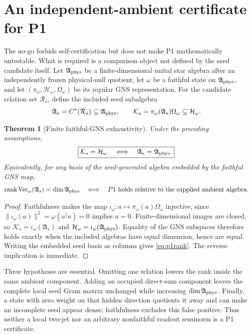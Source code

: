 \documentclass[11pt,a4paper]{article}
\newtheorem{theorem}[definition]{Theorem}
\theoremstyle{remark}
\newcommand{\Aphys}{\mathfrak A_{\rm phys}}
\newcommand{\Aseed}{\mathfrak A_s}
\begin{document}
\section{An independent-ambient certificate for P1}

The no-go forbids self-certification but does not make P1 mathematically
untestable.  What is required is a comparison object not defined by the seed
candidate itself.  Let $\Aphys$ be a finite-dimensional unital star algebra
after an independently frozen physical-null quotient, let $\omega$ be a
faithful state on $\Aphys$, and let
$(\pi_\omega,\mathcal H_\omega,\Omega_\omega)$ be its regular GNS representation.
For the candidate relation set $\mathcal R_s$, define the included seed
subalgebra
\begin{equation}
 \Aseed=C^*(\mathcal R_s)\subseteq\Aphys,
 \qquad
 \mathcal K_s=\pi_\omega(\Aseed)\Omega_\omega\subseteq\mathcal H_\omega.
 \label{eq:ambientgns}
\end{equation}

\begin{theorem}[Finite faithful-GNS exhaustivity]
Under the preceding assumptions,
\begin{equation}
 \boxed{
 \mathcal K_s=\mathcal H_\omega
 \quad\Longleftrightarrow\quad
 \Aseed=\Aphys.}
 \label{eq:p1gns}
\end{equation}
Equivalently, for any basis of the seed-generated algebra embedded by the
faithful GNS map,
\begin{equation}
 \operatorname{rank}\operatorname{Vec}_\omega(\Aseed)
 =\dim\Aphys
 \quad\Longleftrightarrow\quad P1
 \text{ holds relative to the supplied ambient algebra.}
 \label{eq:p1rank}
\end{equation}
\end{theorem}

\begin{proof}
Faithfulness makes the map
$\iota_\omega:a\mapsto\pi_\omega(a)\Omega_\omega$ injective, since
$\lVert\iota_\omega(a)\rVert^2=\omega(a^\dagger a)=0$ implies $a=0$.
Finite-dimensional images are closed, so
$\mathcal K_s=\iota_\omega(\Aseed)$ and
$\mathcal H_\omega=\iota_\omega(\Aphys)$.  Equality of the GNS subspaces therefore
holds exactly when the included algebras have equal dimension, hence are
equal.  Writing the embedded seed basis as columns gives
\eqref{eq:p1rank}.  The reverse implication is immediate.
\end{proof}

Three hypotheses are essential.  Omitting one relation lowers the rank inside
the same ambient component.  Adding an occupied direct-sum component leaves
the complete local seed Gram matrix unchanged while increasing
$\dim\Aphys$.  Finally, a state with zero weight on that hidden direction
quotients it away and can make an incomplete seed appear dense; faithfulness
excludes this false positive.  Thus neither a local two-jet nor an arbitrary
nonfaithful readout seminorm is a P1 certificate.
\end{document}
